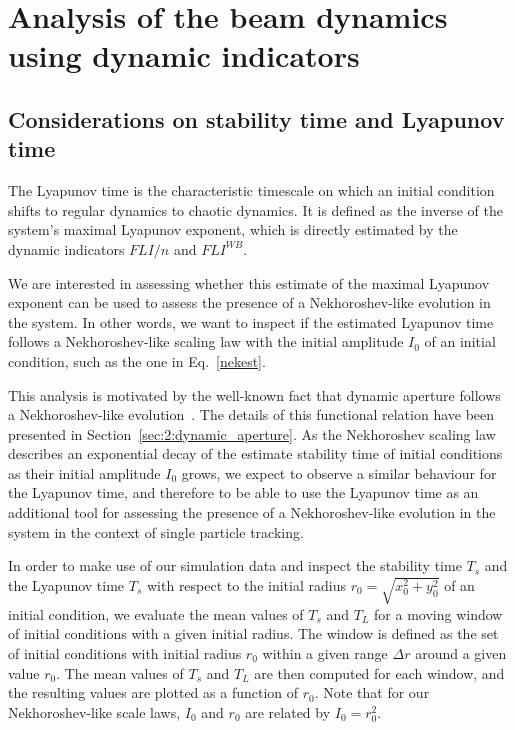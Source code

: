 \section{Analysis of the beam dynamics using dynamic indicators}\label{sec:8:detailed}

\subsection{Considerations on stability time and Lyapunov time}

The Lyapunov time is the characteristic timescale on which an initial condition shifts to regular dynamics to chaotic dynamics. It is defined as the inverse of the system's maximal Lyapunov exponent, which is directly estimated by the dynamic indicators $FLI/n$ and $FLI^{{WB}}$.

We are interested in assessing whether this estimate of the maximal Lyapunov exponent can be used to assess the presence of a Nekhoroshev-like evolution in the system. In other words, we want to inspect if the estimated Lyapunov time follows a Nekhoroshev-like scaling law with the initial amplitude $I_0$ of an initial condition, such as the one in Eq.~\eqref{nekest}.

This analysis is motivated by the well-known fact that dynamic aperture follows a Nekhoroshev-like evolution~\cite{Bazzani:2019csk}. The details of this functional relation have been presented in Section~\ref{sec:2:dynamic_aperture}. As the Nekhoroshev scaling law describes an exponential decay of the estimate stability time of initial conditions as their initial amplitude $I_0$ grows, we expect to observe a similar behaviour for the Lyapunov time, and therefore to be able to use the Lyapunov time as an additional tool for assessing the presence of a Nekhoroshev-like evolution in the system in the context of single particle tracking.

In order to make use of our simulation data and inspect the stability time $T_s$ and the Lyapunov time $T_s$ with respect to the initial radius $r_0 = \sqrt{x_0^2 + y_0^2}$ of an initial condition, we evaluate the mean values of $T_s$ and $T_L$ for a moving window of initial conditions with a given initial radius. The window is defined as the set of initial conditions with initial radius $r_0$ within a given range $\Delta r$ around a given value $r_0$. The mean values of $T_s$ and $T_L$ are then computed for each window, and the resulting values are plotted as a function of $r_0$. Note that for our Nekhoroshev-like scale laws, $I_0$ and $r_0$ are related by $I_0 = r_0^2$.

